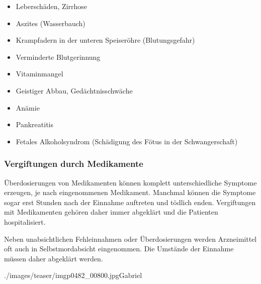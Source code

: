 {
{
\begin{itemize}
    \item Leberschäden, Zirrhose
    \item Aszites (Wasserbauch)
    \item Krampfadern in der unteren Speiseröhre  (Blutungsgefahr)
    \item Verminderte Blutgerinnung
    \item Vitaminmangel
    \item Geistiger Abbau, Gedächtnisschwäche
    \item Anämie
    \item Pankreatitis
    \item Fetales Alkoholsyndrom (Schädigung des Fötus in der Schwangerschaft)
    \cite{Jones1973,Guerri2009}
\end{itemize}
}{	

}{}{}{}













\subsubsection{Vergiftungen durch Medikamente}

{%
Überdosierungen von Medikamenten können komplett
unterschiedliche Symptome erzeugen, je nach eingenommenen
Medikament. Manchmal können die Symptome sogar erst Stunden
nach der Einnahme auftreten und tödlich enden. Vergiftungen
mit Medikamenten gehören daher immer abgeklärt und die
Patienten hospitalisiert. 

Neben unabsichtlichen Fehleinnahmen oder Überdosierungen
werden Arzneimittel oft auch in Selbstmordabsicht
eingenommen. Die Umstände der Einnahme müssen daher
abgeklärt werden.
}{

}{./images/teaser/imgp0482_00800.jpg}{}{Gabriel}

}
